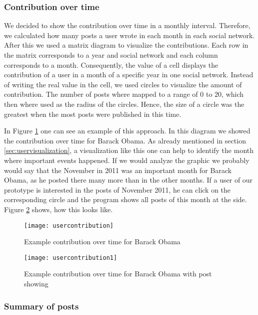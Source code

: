 \subsubsection{Contribution over time}
We decided to show the contribution over time in a monthly interval. Therefore, we calculated how many posts a user wrote in each month in each social network. 
After this we used a matrix diagram to visualize the contributions. Each row in the matrix corresponds to a year and social network and each column corresponds to a month. Consequently, the value of a cell displays the contribution of a user in a month of a specific year in one social network. Instead of writing the real value in the cell, we used circles to visualize the amount of contribution. The number of posts where mapped to a range of $0$ to $20$, which then where used as the radius of the circles. Hence, the size of a circle was the greatest when the most posts were published in this time. 


In Figure \ref{fig:contribution} one can see an example of this approach. In this diagram we showed the contribution over time for Barack Obama. As already mentioned in section \ref{sec:uservisualization}, a visualization like this one can help to identify the month where important events happened. If we would analyze the graphic we probably would say that the November in 2011 was an important month for Barack Obama, as he posted there many more than in the other months. If a user of our prototype is interested in the posts of November 2011, he can click on the corresponding circle and the program shows all posts of this month at the side. Figure \ref{fig:contribution2} shows, how this looks like.  

\begin{figure}[t]
	\centering
	\texttt{[image: usercontribution]}
	\caption{Example contribution over time for Barack Obama}
	\label{fig:contribution}
\end{figure}

\begin{figure}[t]
	\centering
	\texttt{[image: usercontribution1]}
	\caption{Example contribution over time for Barack Obama with post showing}
	\label{fig:contribution2}
\end{figure}

\subsubsection{Summary of posts}


